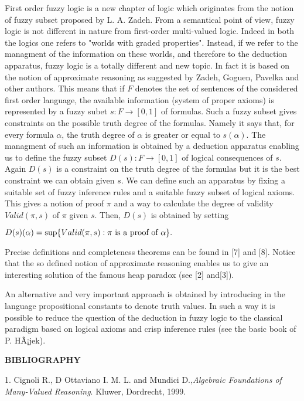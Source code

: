 \documentclass[12pt]{article}
\begin{document}
First order fuzzy logic is a new chapter of logic which originates from the notion of fuzzy subset proposed by L. A. Zadeh. From a semantical point of view, fuzzy logic is not different in nature from first-order multi-valued logic. Indeed in both the logics one refers to "worlds with graded properties". Instead, if we refer to the managment of the information on these worlds, and therefore to the deduction apparatus, fuzzy logic is a totally different and new topic. In fact it is based on the notion of approximate reasoning as suggested by Zadeh, Goguen, Pavelka and other authors. This means that if $F$ denotes the set of sentences of the considered first order language, the available information (system of proper axioms) is represented by a fuzzy subet $s : F \rightarrow [0,1]$ of formulas. Such a fuzzy subset gives constraints on the possible truth degree of the formulas. Namely it says that, for every formula $\alpha$, the truth degree of $\alpha$ is greater or equal to $s(\alpha)$. The managment of such an information is obtained by a deduction apparatus enabling us to define the fuzzy subset $D(s): F \rightarrow [0,1]$ of logical consequences of $s$. Again $D(s)$ is a constraint on the truth degree of the formulas but it is the best constraint we can obtain given $s$. We can define such an apparatus by fixing a suitable set of fuzzy inference rules and a suitable fuzzy subset of logical axioms. This gives a notion of proof $\pi$ and a way to calculate the  degree of validity $Valid(\pi,s)$ of $\pi$ given $s$. Then, $D(s)$ is obtained by setting

$D(s)(\alpha) = \sup\{Valid(\pi,s) : \pi \hbox{ is a proof of }\alpha \}.$

Precise definitions and completeness theorems can be found in [7] and [8]. Notice that the so defined notion of approximate reasoning enables us to give an interesting solution of the famous heap paradox (see [2] and[3]). 

An alternative and very important approach is obtained by introducing in the language propositional constants to denote truth values. In such a way it is possible to reduce the question of the deduction in fuzzy logic to the classical paradigm based on logical axioms and crisp inference rules (see the basic book of P. HÃ¡jek).

{\bf BIBLIOGRAPHY } 

1. Cignoli R., D Ottaviano I. M. L. and Mundici D.,{\em Algebraic Foundations of Many-Valued Reasoning}. Kluwer, Dordrecht, 1999.
\end{document}
